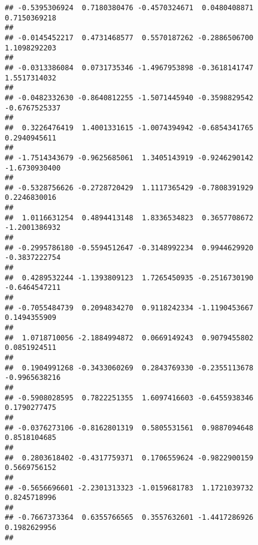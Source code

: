 \documentclass[]{article}
\begin{document}
\begin{verbatim}
## -0.5395306924  0.7180380476 -0.4570324671  0.0480408871  0.7150369218 
##                                                                       
## -0.0145452217  0.4731468577  0.5570187262 -0.2886506700  1.1098292203 
##                                                                       
## -0.0313386084  0.0731735346 -1.4967953898 -0.3618141747  1.5517314032 
##                                                                       
## -0.0482332630 -0.8640812255 -1.5071445940 -0.3598829542 -0.6767525337 
##                                                                       
##  0.3226476419  1.4001331615 -1.0074394942 -0.6854341765  0.2940945611 
##                                                                       
## -1.7514343679 -0.9625685061  1.3405143919 -0.9246290142 -1.6730930400 
##                                                                       
## -0.5328756626 -0.2728720429  1.1117365429 -0.7808391929  0.2246830016 
##                                                                       
##  1.0116631254  0.4894413148  1.8336534823  0.3657708672 -1.2001386932 
##                                                                       
## -0.2995786180 -0.5594512647 -0.3148992234  0.9944629920 -0.3837222754 
##                                                                       
##  0.4289532244 -1.1393809123  1.7265450935 -0.2516730190 -0.6464547211 
##                                                                       
## -0.7055484739  0.2094834270  0.9118242334 -1.1190453667  0.1494355909 
##                                                                       
##  1.0718710056 -2.1884994872  0.0669149243  0.9079455802  0.0851924511 
##                                                                       
##  0.1904991268 -0.3433060269  0.2843769330 -0.2355113678 -0.9965638216 
##                                                                       
## -0.5908028595  0.7822251355  1.6097416603 -0.6455938346  0.1790277475 
##                                                                       
## -0.0376273106 -0.8162801319  0.5805531561  0.9887094648  0.8518104685 
##                                                                       
##  0.2803618402 -0.4317759371  0.1706559624 -0.9822900159  0.5669756152 
##                                                                       
## -0.5656696601 -2.2301313323 -1.0159681783  1.1721039732  0.8245718996 
##                                                                       
## -0.7667373364  0.6355766565  0.3557632601 -1.4417286926  0.1982629956 
##                                                                       

\end{verbatim}
\end{document}
